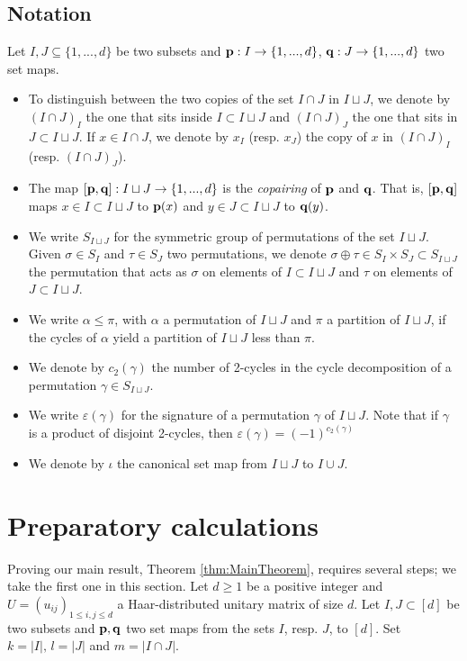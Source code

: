 \documentclass[11pt, a4paper, oneside, reqno]{amsart}
\newcommand{\copairpq}{{[{\bf p},{\bf q}]}}
\theoremstyle{remark}
\theoremstyle{definition}
\numberwithin{equation}{section}
\begin{document}
\subsection{Notation} Let $I,J \subseteq \{1,...,d\}$ be two subsets and ${\bf p}: I \to \{1,...,d\}$, ${\bf q}: J \to \{1,...,d\}$ two set maps.
\label{sec:Notation}\begin{itemize}
	\item
	      To distinguish between the two copies of the set $I\cap J$ in $I\sqcup J$, we denote by $(I\cap J)_I$ the one that sits inside $I \subset I\sqcup J$ and $(I\cap J)_J$ the one that sits in $J \subset I\sqcup J$. If $x \in I\cap J$, we denote by $x_I$ (resp. $x_J$) the copy of $x$ in $(I\cap J)_I$ (resp. $(I\cap J)_J$).
    \item The map $\copairpq: I \sqcup J \to \{1,...,d\}$ is the {\it copairing} of ${\bf p}$ and ${\bf q}$. That is, $\copairpq$ maps $x \in I \subset I \sqcup J$ to ${\bf p}(x)$ and $y \in J \subset I \sqcup J$ to ${\bf q}(y)$.
	\item We write $S_{I\sqcup J}$ for the symmetric group of permutations of the set $I\sqcup J$. Given $\sigma \in S_I$ and $\tau \in S_J$ two permutations, we denote $\sigma \oplus \tau \in S_{I}\times S_J \subset S_{I \sqcup J}$ the permutation that acts as $\sigma$ on elements of $I\subset I \sqcup J$ and $\tau$ on elements of $J \subset I \sqcup J$.
	\item We write $\alpha \leq \pi$, with $\alpha$ a permutation of $I\sqcup J$ and $\pi$ a partition of $I \sqcup J$, if the cycles of $\alpha$ yield a partition of $I\sqcup J$ less than $\pi$.
	\item We denote by $c_2(\gamma)$ the number of 2-cycles in the cycle decomposition of a permutation $\gamma \in S_{I \sqcup J}$. 
	\item We write $\varepsilon(\gamma)$ for the signature of a permutation $\gamma$ of $I\sqcup J$. Note that if $\gamma$ is a product of disjoint 2-cycles, then $\varepsilon(\gamma) = (-1)^{c_2(\gamma)}$
    \item We denote by $\iota$ the canonical set map from $I \sqcup J$ to $I \cup J$.
\end{itemize}



\section{Preparatory calculations}
Proving our main result, Theorem \ref{thm:MainTheorem}, requires several steps; we take the first one in this section.
Let $d \geq 1$ be a positive integer and $U = (u_{ij})_{1\leq i,j \leq d}$ a Haar-distributed unitary matrix of size $d$.
Let $I,J \subset [d]$ be two subsets and ${\bf p}, {\bf q}$ two set maps from the sets $I$, resp. $J$, to $[d]$. Set
$
	k = |I|,\, l = |J|$ and $m = |I \cap J|.
$
\end{document}
